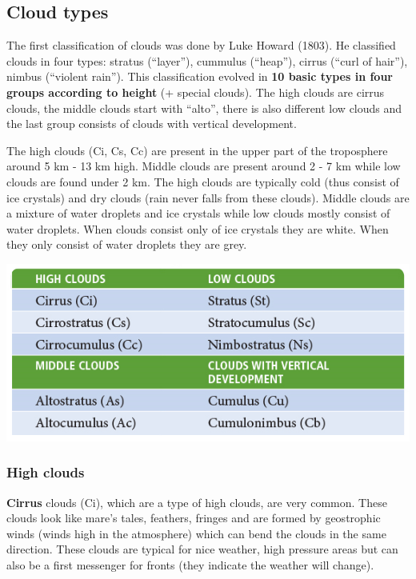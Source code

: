 \documentclass[12pt,oneside]{book}
\begin{document}
\subsection{Cloud types}\label{cloud-types}

The first classification of clouds was done by Luke Howard (1803). He
classified clouds in four types: stratus (``layer''), cummulus
(``heap''), cirrus (``curl of hair''), nimbus (``violent rain''). This
classification evolved in \textbf{10 basic types in four groups
according to height} (+ special clouds). The high clouds are cirrus
clouds, the middle clouds start with ``alto'', there is also different
low clouds and the last group consists of clouds with vertical
development.

The high clouds (Ci, Cs, Cc) are present in the upper part of the
troposphere around 5 km - 13 km high. Middle clouds are present around 2
- 7 km while low clouds are found under 2 km. The high clouds are
typically cold (thus consist of ice crystals) and dry clouds (rain never
falls from these clouds). Middle clouds are a mixture of water droplets
and ice crystals while low clouds mostly consist of water droplets. When
clouds consist only of ice crystals they are white. When they only
consist of water droplets they are grey.

\begin{center}
\label{table:clouds}

\begin{center}\includegraphics[width=0.8\linewidth]{figures/Table24} \end{center}
\end{center}

\subsubsection{High clouds}\label{high-clouds}

\textbf{Cirrus} clouds (Ci), which are a type of high clouds, are very
common. These clouds look like mare's tales, feathers, fringes and are
formed by geostrophic winds (winds high in the atmosphere) which can
bend the clouds in the same direction. These clouds are typical for nice
weather, high pressure areas but can also be a first messenger for
fronts (they indicate the weather will change).
\end{document}
